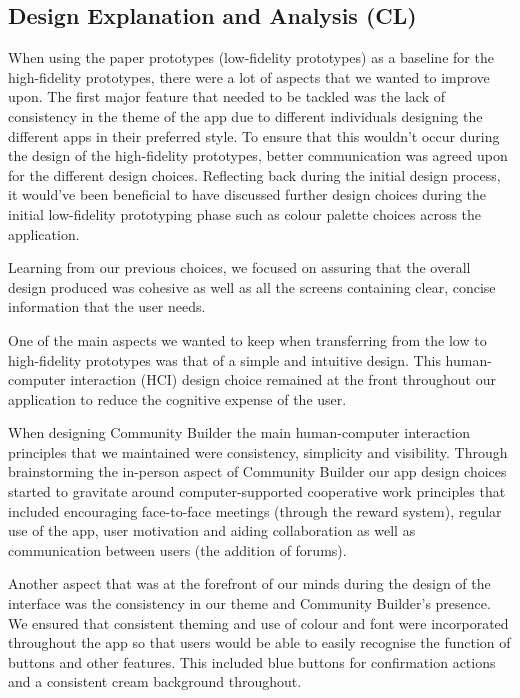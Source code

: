 \documentclass[a4paper,12pt]{article}
\begin{document}
\subsection{Design Explanation and Analysis (CL)}
When using the paper prototypes (low-fidelity prototypes) as a baseline for the high-fidelity prototypes, there were a lot of aspects that we wanted to improve upon. The first major feature that needed to be tackled was the lack of consistency in the theme of the app due to different individuals designing the different apps in their preferred style. To ensure that this wouldn't occur during the design of the high-fidelity prototypes, better communication was agreed upon for the different design choices. Reflecting back during the initial design process, it would've been beneficial to have discussed further design choices during the initial low-fidelity prototyping phase such as colour palette choices across the application. 

Learning from our previous choices, we focused on assuring that the overall design produced was cohesive as well as all the screens containing clear, concise information that the user needs.

One of the main aspects we wanted to keep when transferring from the low to high-fidelity prototypes was that of a simple and intuitive design. This human-computer interaction (HCI) design choice remained at the front throughout our application to reduce the cognitive expense of the user. 

When designing Community Builder the main human-computer interaction principles that we maintained were consistency, simplicity and visibility. Through brainstorming the in-person aspect of Community Builder our app design choices started to gravitate around computer-supported cooperative work principles that included encouraging face-to-face meetings (through the reward system), regular use of the app, user motivation and aiding collaboration as well as communication between users (the addition of forums). 

Another aspect that was at the forefront of our minds during the design of the interface was the consistency in our theme and Community Builder's presence. We ensured that consistent theming and use of colour and font were incorporated throughout the app so that users would be able to easily recognise the function of buttons and other features. This included blue buttons for confirmation actions and a consistent cream background throughout.
\end{document}
